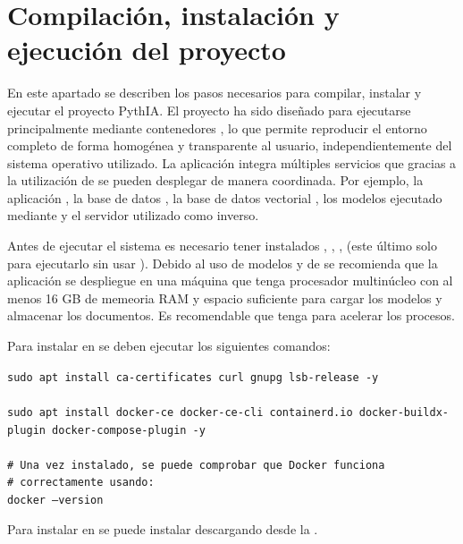 \section{Compilación, instalación y ejecución del proyecto}
\label{prog:comp}

En este apartado se describen los pasos necesarios para compilar, instalar y ejecutar el proyecto PythIA. El proyecto ha sido diseñado para ejecutarse principalmente mediante contenedores , lo que permite reproducir el entorno completo de forma homogénea y transparente al usuario, independientemente del sistema operativo utilizado. La aplicación integra múltiples servicios que gracias a la utilización de  se pueden desplegar de manera coordinada. Por ejemplo, la aplicación , la base de datos , la base de datos vectorial , los modelos  ejecutado mediante  y el servidor  utilizado como  inverso.

Antes de ejecutar el sistema es necesario tener instalados , , ,  (este último solo para ejecutarlo sin usar ). Debido al uso de modelos  y de  se recomienda que la aplicación se despliegue en una máquina que tenga procesador multinúcleo con al menos 16 GB de memeoria RAM y espacio suficiente para cargar los modelos y almacenar los documentos. Es recomendable que tenga  para acelerar los procesos.

Para instalar  en  se deben ejecutar los siguientes comandos:

\begin{tcolorbox}[
	colback=black!3,
	colframe=black!30,
	boxrule=0.5pt,
	arc=2mm,
	title= Terminal,
	fonttitle=\bfseries,
	breakable
]
	{\footnotesize
		\noindent
		\texttt{sudo apt install ca-certificates curl gnupg lsb-release -y}\\
		\\
		\texttt{sudo apt install docker-ce docker-ce-cli containerd.io docker-buildx-plugin docker-compose-plugin -y} \\
		\\
		\texttt{\# Una vez instalado, se puede comprobar que Docker funciona}\\
		\texttt{\# correctamente usando:} \\
		\texttt{docker --version}
	}
\end{tcolorbox}

Para instalar  en  se puede instalar descargando  desde la .

